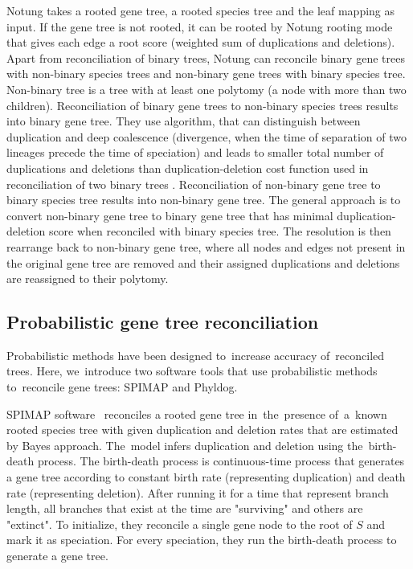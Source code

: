 Notung takes a rooted gene tree, a rooted species tree and the leaf mapping as input. If the gene tree is not rooted, it can be rooted by Notung rooting mode that gives each edge a root score (weighted sum of duplications and deletions). Apart from reconciliation of binary trees, Notung can reconcile binary gene trees with non-binary species trees and non-binary gene trees with binary species tree. Non-binary tree is a tree with at least one polytomy (a node with more than two children).
Reconciliation of binary gene trees to non-binary species trees results into binary gene tree. They use algorithm, that can distinguish between duplication and deep coalescence (divergence, when the time of separation of two  lineages precede the time of speciation) and leads to smaller total number of duplications and deletions than duplication-deletion cost function used in reconciliation of two binary trees \cite{vernot}. 
Reconciliation of non-binary gene tree to binary species tree results into non-binary gene tree. The general approach is to convert non-binary gene tree to binary gene tree that has minimal duplication-deletion score when reconciled with binary species tree. The resolution is then rearrange back to non-binary gene tree, where all nodes and edges not present in the original gene tree are removed and their assigned duplications and deletions are reassigned to their polytomy.

\subsection{Probabilistic gene tree reconciliation}
Probabilistic methods have been designed to~increase accuracy of~reconciled trees. Here, we~introduce two software tools that use probabilistic methods to~reconcile gene trees: SPIMAP and Phyldog.

SPIMAP software~\cite{spimap} reconciles a rooted gene tree in~the~presence of~a~known rooted species tree with given duplication and deletion rates that are estimated by Bayes approach. The~model infers duplication and deletion using the~birth-death process. The birth-death process is continuous-time process that generates a gene tree according to constant birth rate (representing duplication) and death rate (representing deletion). After running it for a time that represent branch length, all branches that exist at the time are "surviving" and others are "extinct". To initialize, they reconcile a single gene node to the root of $S$ and mark it as speciation. For every speciation, they run the birth-death process to generate a gene tree.

